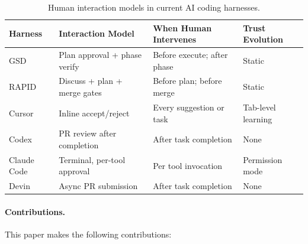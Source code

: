\documentclass[11pt, a4paper, copyright]{googledeepmind}
\begin{document}
\begin{table}[t]
\centering
\caption{Human interaction models in current AI coding harnesses.}
\label{tab:harness-interaction}
\small
\begin{tabular}{llll}
\toprule
\textbf{Harness} & \textbf{Interaction Model} & \textbf{When Human Intervenes} & \textbf{Trust Evolution} \\
\midrule
GSD & Plan approval + phase verify & Before execute; after phase & Static \\
RAPID & Discuss + plan + merge gates & Before plan; before merge & Static \\
Cursor & Inline accept/reject & Every suggestion or task & Tab-level learning \\
Codex & PR review after completion & After task completion & None \\
Claude Code & Terminal, per-tool approval & Per tool invocation & Permission mode \\
Devin & Async PR submission & After task completion & None \\
\bottomrule
\end{tabular}
\end{table}

\paragraph{Contributions.} This paper makes the following contributions:
\end{document}
